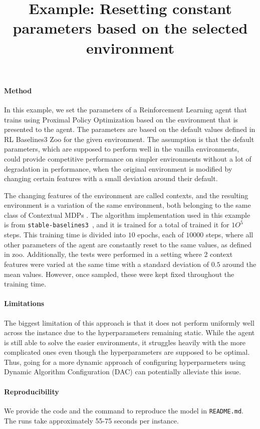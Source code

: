 \documentclass[11pt, final]{article}
\title{Example: Resetting constant parameters based on the selected environment}
\author[1,2]{\nameemail{Aditya Mohan}{}}
\affil[1]{Leibniz University Hannover}
\affil[2]{\url{https://www.AutoML.org}}
\begin{document}
\maketitle

\paragraph{Method}
In this example, we set the parameters of a Reinforcement Learning agent that trains using Proximal Policy Optimization \cite{schulman2017proximal} based on the environment that is presented to the agent. The parameters are based on the default values defined in RL Baselines3 Zoo \cite{rl-zoo} for the given environment. The assumption is that the default parameters, which are supposed to perform well in the vanilla environments, could provide competitive performance on simpler environments without a lot of degradation in performance, when the original environment is modified by changing certain features with a small deviation around their default. 

The changing features of the environment are called contexts, and the resulting environment is a variation of the same environment, both belonging to the same class of Contextual MDPs \cite{hallak2015contextual}. The algorithm implementation used in this example is from  \texttt{stable-baselines3}~\citep{stable-baselines3}, and it is trained for a total of trained it for $1O^{5}$ steps. This training time is divided into $10$ epochs, each of $10000$ steps, where all other parameters of the agent are constantly reset to the same values, as defined in zoo. Additionally, the tests were performed in a setting where 2 context features were varied at the same time with a standard deviation of $0.5$ around the mean values. However, once sampled, these were kept fixed throughout the training time.


\paragraph{Limitations}
The biggest limitation of this approach is that it does not perform uniformly well across the instance due to the hyperparameters remaining static. While the agent is still able to solve the easier environments, it struggles heavily with the more complicated ones even though the hyperparameters are supposed to be optimal. Thus, going for a more dynamic approach of configuring hyperparmeters using Dynamic Algorithm Configuration (DAC) \cite{biedenkapp2020dynamic} can potentially alleviate this issue.

\paragraph{Reproducibility}
We provide the code and the command to reproduce the model in \texttt{README.md}. The runs take approximately 55-75 seconds per instance.



\end{document}

